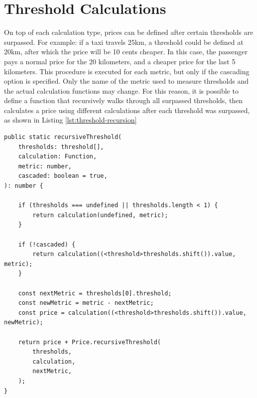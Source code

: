 \section{Threshold Calculations}
On top of each calculation type, prices can be defined after certain thresholds are surpassed. For example: if a taxi travels 25km, a threshold could be defined at 20km, after which the price will be 10 cents cheaper. In this case, the passenger pays a normal price for the 20 kilometers, and a cheaper price for the last 5 kilometers. This procedure is executed for each metric, but only if the cascading option is specified.  Only the name of the metric used to measure thresholds and the actual calculation functions may change. For this reason, it is possible to define a function that recursively walks through all surpassed thresholds, then calculates a price using different calculations after each threshold was surpassed, as shown in Listing \ref{lst:threshold-recursion}

\begin{center}
\noindent\begin{minipage}{.85\textwidth}
\begin{lstlisting}[caption={Recursive threshold calculation.}, label={lst:threshold-recursion}]
public static recursiveThreshold(
	thresholds: threshold[],
	calculation: Function,
	metric: number,
	cascaded: boolean = true,
): number {

	if (thresholds === undefined || thresholds.length < 1) {
		return calculation(undefined, metric);
	}

	if (!cascaded) {
		return calculation((<threshold>thresholds.shift()).value, metric);
	}

	const nextMetric = thresholds[0].threshold;
	const newMetric = metric - nextMetric;
	const price = calculation((<threshold>thresholds.shift()).value, newMetric);

	return price + Price.recursiveThreshold(
		thresholds,
		calculation,
		nextMetric,
	);
}
\end{lstlisting}
\end{minipage}
\end{center}


